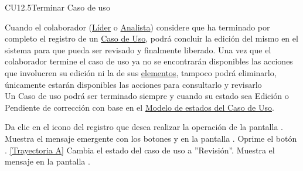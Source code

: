 	\begin{UseCase}{CU12.5}{Terminar Caso de uso}{
			
			Cuando el colaborador (\hyperlink{jefe}{Líder} o \hyperlink{analista}{Analista}) considere que ha terminado por completo el registro de un \hyperlink{casoUso}{Caso de Uso}, podrá concluir la edición del mismo en el sistema para que pueda ser revisado y finalmente liberado.
			Una vez que el colaborador termine el caso de uso ya no se encontrarán disponibles las acciones que involucren su edición ni la de sus \hyperlink{tElemento}{elementos}, tampoco podrá eliminarlo, únicamente estarán disponibles las acciones para consultarlo y revisarlo \\
		
			Un Caso de uso podrá ser terminado siempre y cuando su estado sea Edición o Pendiente de corrección con base en el \hyperlink{edoCU}{Modelo de estados del Caso de Uso}. 
			
	}
	\end{UseCase}
	\begin{UCtrayectoria}
		\UCpaso[\UCactor] Da clic en el icono  del registro que desea realizar la operación de la pantalla .
		\UCpaso[\UCsist] Muestra el mensaje emergente  con los botones  y  en la pantalla .
		\UCpaso[\UCactor] Oprime el botón . \hyperlink{CU12-5:TAA}{[Trayectoria A]}
		\UCpaso[\UCsist] Cambia el estado del caso de uso a ''Revisión''.
		\UCpaso[\UCsist] Muestra el mensaje  en la pantalla .
	\end{UCtrayectoria}		

